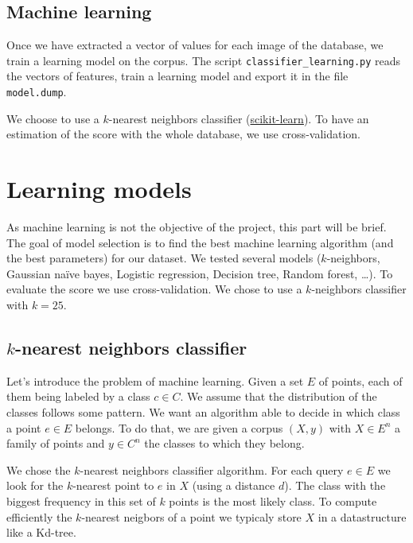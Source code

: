 \documentclass[a4paper, 11pt]{article}
\begin{document}
\subsection{Machine learning}

Once we have extracted a vector of values for each image of the database, we train a learning model on the corpus. The script \verb|classifier_learning.py| reads the vectors of features, train a learning model and export it in the file \verb|model.dump|.

\noindent We choose to use a $k$-nearest neighbors classifier (\href{http://scikit-learn.org/stable/modules/generated/sklearn.neighbors.KNeighborsClassifier.html}{scikit-learn}).
To have an estimation of the score with the whole database, we use cross-validation.

\newpage
\section{Learning models}

As machine learning is not the objective of the project, this part will be brief. The goal of model selection is to find the best machine learning algorithm (and the best parameters) for our dataset. We tested several models ($k$-neighbors, Gaussian naïve bayes, Logistic regression, Decision tree, Random forest, \dots). To evaluate the score we use cross-validation. We chose to use a $k$-neighbors classifier with $k= 25$.


\subsection{$k$-nearest neighbors classifier}

Let's introduce the problem of machine learning. Given a set $E$ of points, each of them being labeled by a class $c \in C$. We assume that the distribution of the classes follows some pattern. We want an algorithm able to decide in which class a point $e \in E$ belongs. To do that, we are given a corpus $(X, y)$ with $X \in E^n$ a family of points and $y \in C^n$ the classes to which they belong. 

We chose the $k$-nearest neighbors classifier algorithm. For each query $e \in E$ we look for the $k$-nearest point to $e$ in $X$ (using a distance $d$). The class with the biggest frequency in this set of $k$ points is the most likely class. To compute efficiently the $k$-nearest neigbors of a point we typicaly store $X$ in a datastructure like a Kd-tree.
\end{document}
